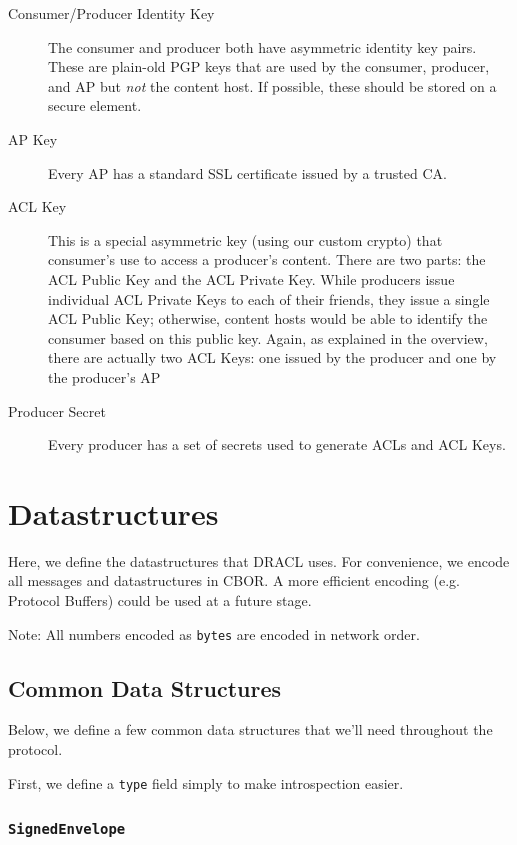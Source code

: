 \documentclass[pdftex,12pt,a4papaer,twoside,notitlepage]{report}
\begin{document}
\begin{appendices}
\begin{description}
\item[Consumer/Producer Identity Key] The consumer and producer both have
  asymmetric identity key pairs. These are plain-old PGP keys that are used by
  the consumer, producer, and AP but \emph{not} the content host. If possible,
  these should be stored on a secure element.
\item[AP Key] Every AP has a standard SSL certificate issued by a trusted CA.
\item[ACL Key] This is a special asymmetric key (using our custom crypto) that
  consumer's use to access a producer's content. There are two parts: the ACL
  Public Key and the ACL Private Key. While producers issue individual ACL
  Private Keys to each of their friends, they issue a single ACL Public Key;
  otherwise, content hosts would be able to identify the consumer based on this
  public key. Again, as explained in the overview, there are actually two ACL
  Keys: one issued by the producer and one by the producer's AP
\item[Producer Secret] Every producer has a set of secrets used to generate ACLs
  and ACL Keys.
\end{description}

\section{Datastructures}

Here, we define the datastructures that DRACL uses. For convenience, we encode
all messages and datastructures in CBOR. A more efficient encoding (e.g.
Protocol Buffers) could be used at a future stage.

Note: All numbers encoded as \texttt{bytes} are encoded in network order.

\subsection{Common Data Structures}

Below, we define a few common data structures that we'll need throughout the
protocol.

First, we define a \texttt{type} field simply to make introspection easier.

\subsubsection{\texttt{SignedEnvelope}}


\end{appendices}
\end{document}
